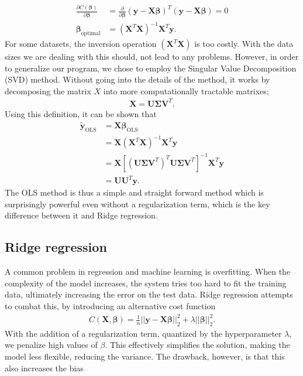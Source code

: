 \documentclass[a4paper, twocolumn]{article}
\begin{document}
\begin{align}
\frac{\partial C(\bm\beta)}{\partial \bm\beta} &= \frac{\partial}{\partial \bm\beta} (\mathbf{y}-\mathbf{X}\bm\beta)^T (\mathbf{y}-\mathbf{X}\bm\beta) = 0 \nonumber \\
\bm\beta_\text{optimal} &= \left(\mathbf{X}^T\mathbf{X}\right)^{-1}\mathbf{X}^T\mathbf{y}.
\end{align}
For some datasets, the inversion operation $\left(\mathbf{X}^T\mathbf{X}\right)$ is too costly. With the data sizes we are dealing with this should, not lead to any problems. However, in order to generalize our program, we chose to employ the Singular Value Decomposition (SVD) method. Without going into the details of the method, it works by decomposing the matrix $X$ into more computationally tractable matrixes;
\begin{align}
\mathbf{X} = \mathbf{U}\mathbf{\Sigma}\mathbf{V}^T.
\end{align}
Using this definition, it can be shown that
\begin{align}
\tilde{\mathbf{y}}_\text{OLS} &= \mathbf{X}\bm\beta_\text{OLS} \nonumber \\
&= \mathbf{X}\left(\mathbf{X}^T\mathbf{X}\right)^{-1}\mathbf{X}^T\mathbf{y} \nonumber \\
&= \mathbf{X} \left[ \left(\mathbf{U}\bm\Sigma \mathbf{V}^T\right)^T \mathbf{U}\bm\Sigma \mathbf{V}^T \right]^{-1} \mathbf{X}^T \mathbf{y} \nonumber \\
&= \mathbf{U}\mathbf{U}^T\mathbf{y}. \label{eq:principal1}
\end{align}
The OLS method is thus a simple and straight forward method which is surprisingly powerful even without a regularization term, which is the key difference between it and Ridge regression.

\subsection{Ridge regression}
A common problem in regression and machine learning is overfitting. When the complexity of the model increases, the system tries too hard to fit the training data, ultimately increasing the error on the test data. Ridge regression attempts to combat this, by introducing an alternative cost function
\begin{align}
  C(\boldsymbol{X},\boldsymbol{\beta})=\frac{1}{n}\vert\vert \boldsymbol{y}-\boldsymbol{X}\boldsymbol{\beta}\vert\vert_2^2+\lambda\vert\vert \boldsymbol{\beta}\vert\vert_2^2.
\end{align}
With the addition of a regularization term, quantized by the hyperparameter $\lambda$, we penalize high values of $\beta$. This effectively simplifies the solution, making the model less flexible, reducing the variance. The drawback, however, is that this also increases the bias 
\end{document}
